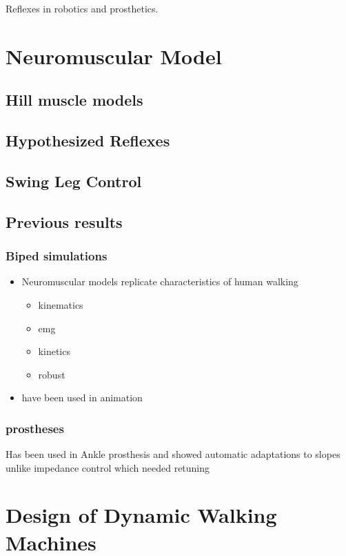 Reflexes in robotics and prosthetics.

\section{Neuromuscular Model}

\subsection{Hill muscle models}
\subsection{Hypothesized Reflexes}
\subsection{Swing Leg Control}
\subsection{Previous results}
\subsubsection{Biped simulations}
    \begin{itemize}
        \item Neuromuscular models replicate characteristics of human walking
        \begin{itemize}
            \item kinematics
            \item emg
            \item kinetics
            \item robust
        \end{itemize}

        \item have been used in animation
    \end{itemize}

\subsubsection{prostheses}
    Has been used in Ankle prosthesis and showed automatic adaptations to slopes
    unlike impedance control which needed retuning


\section{Design of Dynamic Walking Machines}


